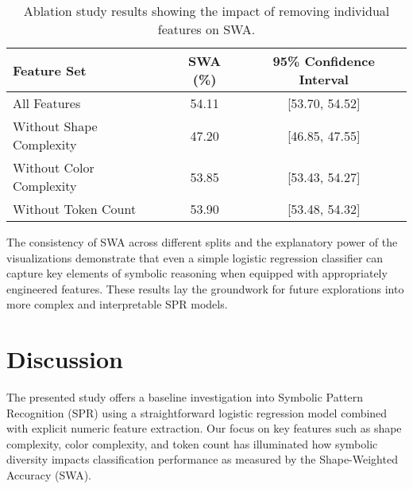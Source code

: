 \documentclass{article}
\begin{document}
\begin{table}[h]
\centering
\begin{tabular}{|l|c|c|}
\hline
\textbf{Feature Set} & \textbf{SWA (\%)} & \textbf{95\% Confidence Interval} \\ \hline
All Features & 54.11 & [53.70, 54.52] \\ \hline
Without Shape Complexity & 47.20 & [46.85, 47.55] \\ \hline
Without Color Complexity & 53.85 & [53.43, 54.27] \\ \hline
Without Token Count & 53.90 & [53.48, 54.32] \\ \hline
\end{tabular}
\caption{Ablation study results showing the impact of removing individual features on SWA.}
\label{tab:ablation}
\end{table}

The consistency of SWA across different splits and the explanatory power of the visualizations demonstrate that even a simple logistic regression classifier can capture key elements of symbolic reasoning when equipped with appropriately engineered features. These results lay the groundwork for future explorations into more complex and interpretable SPR models.

\section{Discussion}
The presented study offers a baseline investigation into Symbolic Pattern Recognition (SPR) using a straightforward logistic regression model combined with explicit numeric feature extraction. Our focus on key features such as shape complexity, color complexity, and token count has illuminated how symbolic diversity impacts classification performance as measured by the Shape-Weighted Accuracy (SWA).
\end{document}
